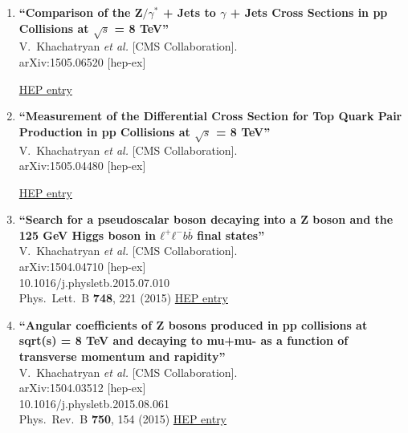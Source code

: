 \documentclass{article}
\begin{document}
\begin{enumerate}
\item%
{\bf ``Comparison of the Z$/\gamma^{*}$ + Jets to $\gamma$ + Jets Cross Sections in pp Collisions at $\sqrt{s}$ = 8 TeV''}
  \\{}V.~Khachatryan {\it et al.} [CMS Collaboration].
  \\{}arXiv:1505.06520 [hep-ex]
  
\href{http://inspirehep.net/record/1372730}{HEP entry}


\item%
{\bf ``Measurement of the Differential Cross Section for Top Quark Pair Production in pp Collisions at $\sqrt{s}$ = 8 TeV''}
  \\{}V.~Khachatryan {\it et al.} [CMS Collaboration].
  \\{}arXiv:1505.04480 [hep-ex]
  
\href{http://inspirehep.net/record/1370682}{HEP entry}


\item%
{\bf ``Search for a pseudoscalar boson decaying into a Z boson and the 125 GeV Higgs boson in $ℓ^+ℓ^−b\overline{b}$ final states''}
  \\{}V.~Khachatryan {\it et al.} [CMS Collaboration].
  \\{}arXiv:1504.04710 [hep-ex]
    \\{}10.1016/j.physletb.2015.07.010
\\{}Phys.\ Lett.\ B {\bf 748}, 221 (2015) %
\href{http://inspirehep.net/record/1362177}{HEP entry}


\item%
{\bf ``Angular coefficients of Z bosons produced in pp collisions at sqrt(s) = 8 TeV and decaying to mu+mu- as a function of transverse momentum and rapidity''}
  \\{}V.~Khachatryan {\it et al.} [CMS Collaboration].
  \\{}arXiv:1504.03512 [hep-ex]
    \\{}10.1016/j.physletb.2015.08.061
\\{}Phys.\ Rev.\ B {\bf 750}, 154 (2015) %
\href{http://inspirehep.net/record/1359451}{HEP entry}



\end{enumerate}
\end{document}
